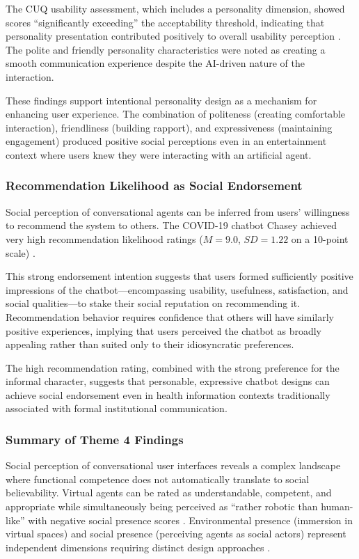 \documentclass[manuscript,anonymous,sigconf]{acmart}
\begin{document}
The CUQ usability assessment, which includes a personality dimension, showed scores ``significantly exceeding'' the acceptability threshold, indicating that personality presentation contributed positively to overall usability perception \cite{A81}. The polite and friendly personality characteristics were noted as creating a smooth communication experience despite the AI-driven nature of the interaction.

These findings support intentional personality design as a mechanism for enhancing user experience. The combination of politeness (creating comfortable interaction), friendliness (building rapport), and expressiveness (maintaining engagement) produced positive social perceptions even in an entertainment context where users knew they were interacting with an artificial agent.

\subsubsection{Recommendation Likelihood as Social Endorsement}

Social perception of conversational agents can be inferred from users' willingness to recommend the system to others. The COVID-19 chatbot Chasey achieved very high recommendation likelihood ratings ($M = 9.0$, $SD = 1.22$ on a 10-point scale) \cite{A79}.

This strong endorsement intention suggests that users formed sufficiently positive impressions of the chatbot---encompassing usability, usefulness, satisfaction, and social qualities---to stake their social reputation on recommending it. Recommendation behavior requires confidence that others will have similarly positive experiences, implying that users perceived the chatbot as broadly appealing rather than suited only to their idiosyncratic preferences.

The high recommendation rating, combined with the strong preference for the informal character, suggests that personable, expressive chatbot designs can achieve social endorsement even in health information contexts traditionally associated with formal institutional communication.

\subsubsection{Summary of Theme 4 Findings}

Social perception of conversational user interfaces reveals a complex landscape where functional competence does not automatically translate to social believability. Virtual agents can be rated as understandable, competent, and appropriate while simultaneously being perceived as ``rather robotic than human-like'' with negative social presence scores \cite{A82}. Environmental presence (immersion in virtual spaces) and social presence (perceiving agents as social actors) represent independent dimensions requiring distinct design approaches \cite{A82}.
\end{document}
